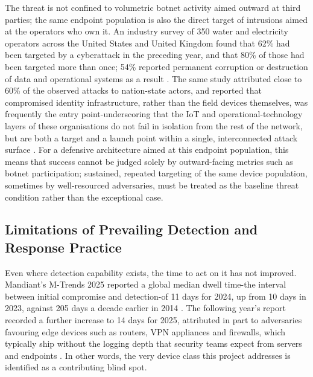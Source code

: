 The threat is not confined to volumetric botnet activity aimed outward at third parties; the same endpoint population is also the direct target of intrusions aimed at the operators who own it. An industry survey of 350 water and electricity operators across the United States and United Kingdom found that 62\% had been targeted by a cyberattack in the preceding year, and that 80\% of those had been targeted more than once; 54\% reported permanent corruption or destruction of data and operational systems as a result \cite{Semperis2025}. The same study attributed close to 60\% of the observed attacks to nation-state actors, and reported that compromised identity infrastructure, rather than the field devices themselves, was frequently the entry point-underscoring that the IoT and operational-technology layers of these organisations do not fail in isolation from the rest of the network, but are both a target and a launch point within a single, interconnected attack surface \cite{Semperis2025}. For a defensive architecture aimed at this endpoint population, this means that success cannot be judged solely by outward-facing metrics such as botnet participation; sustained, repeated targeting of the same device population, sometimes by well-resourced adversaries, must be treated as the baseline threat condition rather than the exceptional case.

\subsection{Limitations of Prevailing Detection and Response Practice}

Even where detection capability exists, the time to act on it has not improved. Mandiant's M-Trends 2025 reported a global median dwell time-the interval between initial compromise and detection-of 11 days for 2024, up from 10 days in 2023, against 205 days a decade earlier in 2014 \cite{Mandiant2025}. The following year's report recorded a further increase to 14 days for 2025, attributed in part to adversaries favouring edge devices such as routers, VPN appliances and firewalls, which typically ship without the logging depth that security teams expect from servers and endpoints \cite{Mandiant2026}. In other words, the very device class this project addresses is identified as a contributing blind spot.

